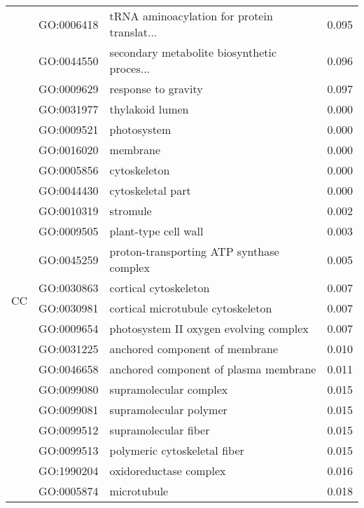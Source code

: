 \begin{longtable}{lllr}
   & GO:0006418 &  tRNA aminoacylation for protein translat... &         0.095 \\
   & GO:0044550 &  secondary metabolite biosynthetic proces... &         0.096 \\
   & GO:0009629 &                          response to gravity &         0.097 \\
\cline{1-4}
\multirow{29}{*}{CC} & GO:0031977 &                              thylakoid lumen &         0.000 \\
   & GO:0009521 &                                  photosystem &         0.000 \\
   & GO:0016020 &                                     membrane &         0.000 \\
   & GO:0005856 &                                 cytoskeleton &         0.000 \\
   & GO:0044430 &                            cytoskeletal part &         0.000 \\
   & GO:0010319 &                                     stromule &         0.002 \\
   & GO:0009505 &                         plant-type cell wall &         0.003 \\
   & GO:0045259 &     proton-transporting ATP synthase complex &         0.005 \\
   & GO:0030863 &                        cortical cytoskeleton &         0.007 \\
   & GO:0030981 &            cortical microtubule cytoskeleton &         0.007 \\
   & GO:0009654 &       photosystem II oxygen evolving complex &         0.007 \\
   & GO:0031225 &               anchored component of membrane &         0.010 \\
   & GO:0046658 &        anchored component of plasma membrane &         0.011 \\
   & GO:0099080 &                       supramolecular complex &         0.015 \\
   & GO:0099081 &                       supramolecular polymer &         0.015 \\
   & GO:0099512 &                         supramolecular fiber &         0.015 \\
   & GO:0099513 &                 polymeric cytoskeletal fiber &         0.015 \\
   & GO:1990204 &                       oxidoreductase complex &         0.016 \\
   & GO:0005874 &                                  microtubule &         0.018 \\

\end{longtable}
